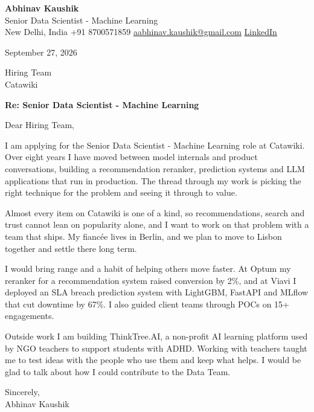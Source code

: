 \documentclass[11pt,a4paper]{article}
\begin{document}
{\Large\bfseries Abhinav Kaushik}\\
Senior Data Scientist - Machine Learning\\
New Delhi, India \textbar{} +91 8700571859 \textbar{} \href{mailto:aabhinav.kaushik@gmail.com}{aabhinav.kaushik@gmail.com} \textbar{} \href{https://www.linkedin.com/in/abhinav-kaushik10/}{LinkedIn}  

September 27, 2026

Hiring Team\\
Catawiki

\textbf{Re: Senior Data Scientist - Machine Learning}

Dear Hiring Team,

I am applying for the Senior Data Scientist - Machine Learning role at Catawiki. Over eight years I have moved between model internals and product conversations, building a recommendation reranker, prediction systems and LLM applications that run in production. The thread through my work is picking the right technique for the problem and seeing it through to value.

Almost every item on Catawiki is one of a kind, so recommendations, search and trust cannot lean on popularity alone, and I want to work on that problem with a team that ships. My fiancée lives in Berlin, and we plan to move to Lisbon together and settle there long term.

I would bring range and a habit of helping others move faster. At Optum my reranker for a recommendation system raised conversion by 2\%, and at Viavi I deployed an SLA breach prediction system with LightGBM, FastAPI and MLflow that cut downtime by 67\%. I also guided client teams through POCs on 15+ engagements.

Outside work I am building ThinkTree.AI, a non-profit AI learning platform used by NGO teachers to support students with ADHD. Working with teachers taught me to test ideas with the people who use them and keep what helps. I would be glad to talk about how I could contribute to the Data Team.

Sincerely,\\[4pt]
Abhinav Kaushik
\end{document}
